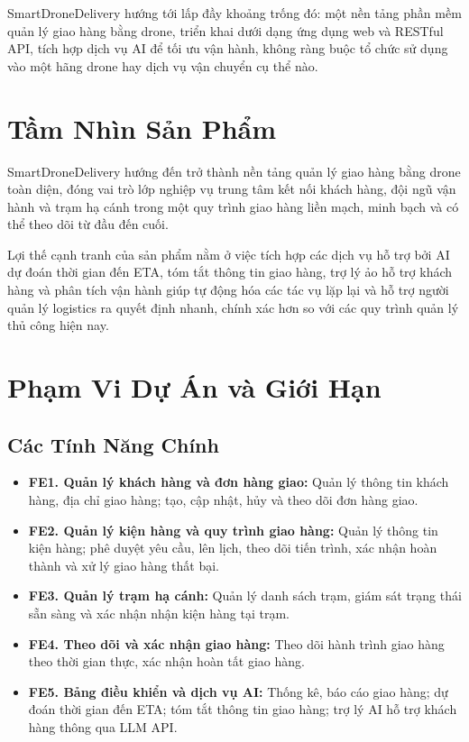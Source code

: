 SmartDroneDelivery hướng tới lấp đầy khoảng trống đó: một nền tảng phần mềm quản lý giao hàng bằng drone, triển khai dưới dạng ứng dụng web và RESTful API, tích hợp dịch vụ AI để tối ưu vận hành, không ràng buộc tổ chức sử dụng vào một hãng drone hay dịch vụ vận chuyển cụ thể nào.

\section{Tầm Nhìn Sản Phẩm}

SmartDroneDelivery hướng đến trở thành nền tảng quản lý giao hàng bằng drone toàn diện, đóng vai trò lớp nghiệp vụ trung tâm kết nối khách hàng, đội ngũ vận hành và trạm hạ cánh trong một quy trình giao hàng liền mạch, minh bạch và có thể theo dõi từ đầu đến cuối.

Lợi thế cạnh tranh của sản phẩm nằm ở việc tích hợp các dịch vụ hỗ trợ bởi AI dự đoán thời gian đến ETA, tóm tắt thông tin giao hàng, trợ lý ảo hỗ trợ khách hàng và phân tích vận hành giúp tự động hóa các tác vụ lặp lại và hỗ trợ người quản lý logistics ra quyết định nhanh, chính xác hơn so với các quy trình quản lý thủ công hiện nay.

\section{Phạm Vi Dự Án và Giới Hạn}

\subsection{Các Tính Năng Chính}

\begin{itemize}
  \item \textbf{FE1. Quản lý khách hàng và đơn hàng giao:} Quản lý thông tin khách hàng, địa chỉ giao hàng; tạo, cập nhật, hủy và theo dõi đơn hàng giao.
  \item \textbf{FE2. Quản lý kiện hàng và quy trình giao hàng:} Quản lý thông tin kiện hàng; phê duyệt yêu cầu, lên lịch, theo dõi tiến trình, xác nhận hoàn thành và xử lý giao hàng thất bại.
  \item \textbf{FE3. Quản lý trạm hạ cánh:} Quản lý danh sách trạm, giám sát trạng thái sẵn sàng và xác nhận nhận kiện hàng tại trạm.
  \item \textbf{FE4. Theo dõi và xác nhận giao hàng:} Theo dõi hành trình giao hàng theo thời gian thực, xác nhận hoàn tất giao hàng.
  \item \textbf{FE5. Bảng điều khiển và dịch vụ AI:} Thống kê, báo cáo giao hàng; dự đoán thời gian đến ETA; tóm tắt thông tin giao hàng; trợ lý AI hỗ trợ khách hàng thông qua LLM API.
\end{itemize}

